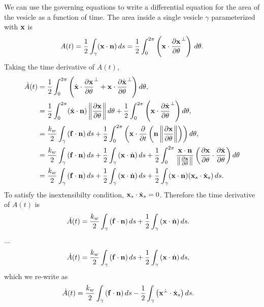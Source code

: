 \documentclass[twoside,twocolumn,9pt]{article}
\begin{document}
We can use the governing equations to write a differential equation for
the area of the vesicle as a function of time. The area inside a single
vesicle $\gamma$ parameterized with $\mathbf{x}$ is
\begin{align}
  A(t) = \frac{1}{2}\int_{\gamma} (\mathbf{x} \cdot \mathbf{n})\, ds = 
    \frac{1}{2}\int_{0}^{2\pi} \left(\mathbf{x} \cdot
    \frac{\partial \mathbf{x}}{\partial \theta}^\perp\right)
    \, d\theta.
\end{align}
Taking the time derivative of $A(t)$,
\begin{align}
  \dot{A}(t) &= \frac{1}{2}\int_{0}^{2\pi} \left(\dot{\mathbf{x}} \cdot
  \frac{\partial \mathbf{x}}{\partial \theta}^{\perp} + 
    \mathbf{x} \cdot \frac{\partial \dot{\mathbf{x}}}{\partial \theta}^{\perp}\right) d\theta, \\
  &= \frac{1}{2}
  \int_{0}^{2\pi}(\dot{\mathbf{x}}\cdot\mathbf{n})\left\|\frac{\partial \mathbf{x}}{\partial \theta}\right\|d\theta +
     \frac{1}{2}\int_{0}^{2\pi}
    \left(\mathbf{x} \cdot \frac{\partial \dot{\mathbf{x}}}{\partial \theta}^{\perp}\right)d\theta, \\
  &= \frac{k_w}{2} \int_{\gamma}\left(\mathbf{f}\cdot\mathbf{n}\right)ds +
  \frac{1}{2}\int_{0}^{2\pi}\left(\mathbf{x} \cdot \frac{\partial }{\partial t}\left(\mathbf{n}
  \left\|\frac{\partial \mathbf{x}}{\partial \theta}\right\|\right)\right)d\theta, \\
  &= \frac{k_w}{2} \int_{\gamma}\left(\mathbf{f}\cdot\mathbf{n}\right)ds + \frac{1}{2}
  \int_{\gamma}\left(\mathbf{x}\cdot\dot{\mathbf{n}}\right)ds + \frac{1}{2}\int_{0}^{2\pi}
  \frac{\mathbf{x}\cdot\mathbf{n}}{\left\|\frac{\partial \mathbf{x}}{\partial \theta}\right\|}
  \left(\frac{\partial \mathbf{x}}{\partial \theta}\cdot
  \frac{\partial \dot{\mathbf{x}}}{\partial \theta}\right)d\theta \\
  &= \frac{k_w}{2} \int_{\gamma}\left(\mathbf{f}\cdot\mathbf{n}\right)ds + \frac{1}{2}
  \int_{\gamma}\left(\mathbf{x}\cdot\dot{\mathbf{n}}\right)ds + \frac{1}{2}\int_{\gamma}
  (\mathbf{x}\cdot\mathbf{n}) (\mathbf{x}_s \cdot \dot{\mathbf{x}}_s)\, ds.
\end{align}
To satisfy the inextensibilty condition, $\mathbf{x}_s \cdot \dot{\mathbf{x}}_s = 0$.
Therefore the time derivative of $A(t)$ is
\begin{align}
     \dot{A}(t) &= \frac{k_w}{2}
     \int_{\gamma}\left(\mathbf{f}\cdot\mathbf{n}\right)ds
     + \frac{1}{2} \int_{\gamma}\left(\mathbf{x}\cdot\dot{\mathbf{n}}\right)ds.
\end{align}
... 
\begin{align}
    \dot{A}(t) &= \frac{k_w}{2}
    \int_{\gamma}\left(\mathbf{f}\cdot\mathbf{n}\right)ds+\frac{1}{2}\int_{\gamma}\left(\mathbf{x}\cdot\dot{\mathbf{n}}\right) ds,
\end{align}
which we re-write as
\begin{align}
    \dot{A}(t) &= \frac{k_w}{2}
    \int_{\gamma}\left(\mathbf{f}\cdot\mathbf{n}\right)ds-\frac{1}{2}\int_{\gamma}\left(\mathbf{x}^{\perp}\cdot\dot{\mathbf{x}}_s\right) ds.
\end{align}
\end{document}

